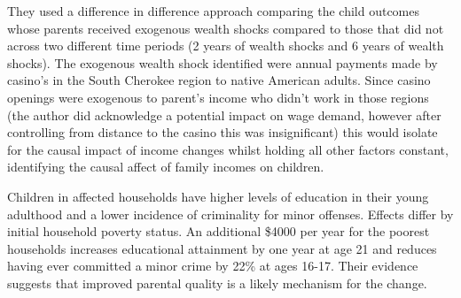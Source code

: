 \documentclass[../Main.tex]{subfiles}
\begin{document}
\begin{refsection}
\begin{itemize}
\begin{answer}
They used a difference in difference approach comparing the child outcomes whose
parents received exogenous wealth shocks compared to those that did not across
two different time periods (2 years of wealth shocks and 6 years of wealth
shocks). The exogenous wealth shock identified were annual payments made by
casino's in the South Cherokee region to native American adults. Since casino
openings were exogenous to parent's income who didn't work in those regions (the
author did acknowledge a potential impact on wage demand, however after
controlling from distance to the casino this was insignificant) this would
isolate for the causal impact of income changes whilst holding all other factors
constant, identifying the causal affect of family incomes on children.

Children in affected households have higher levels of education in their young
adulthood and a lower incidence of criminality for minor offenses. Effects
differ by initial household poverty status. An additional \$4000 per year for
the poorest households increases educational attainment by one year at age 21
and reduces having ever committed a minor crime by 22\% at ages 16-17. Their
evidence suggests that improved parental quality is a likely mechanism for the
change.

\end{answer}

\end{itemize}
\printbibliography
\end{refsection}
\end{document}
